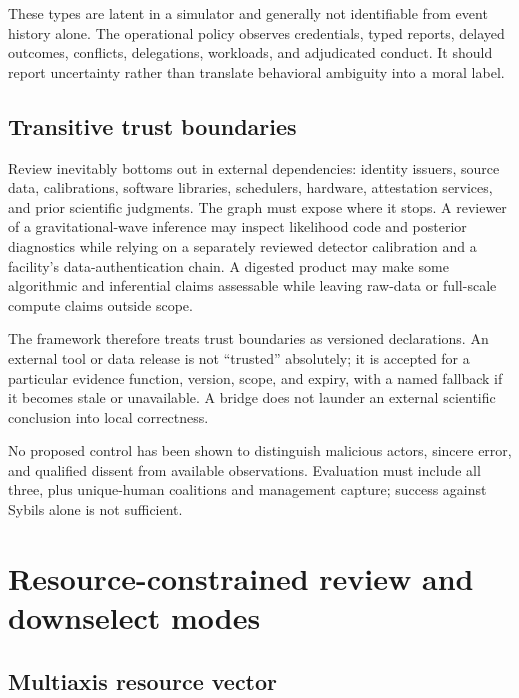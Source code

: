 \documentclass[11pt]{article}
\begin{document}
These types are latent in a simulator and generally not identifiable from event history alone.  The operational policy observes credentials, typed reports, delayed outcomes, conflicts, delegations, workloads, and adjudicated conduct.  It should report uncertainty rather than translate behavioral ambiguity into a moral label.

\subsection{Transitive trust boundaries}

Review inevitably bottoms out in external dependencies: identity issuers, source data, calibrations, software libraries, schedulers, hardware, attestation services, and prior scientific judgments.  The graph must expose where it stops.  A reviewer of a gravitational-wave inference may inspect likelihood code and posterior diagnostics while relying on a separately reviewed detector calibration and a facility's data-authentication chain.  A digested product may make some algorithmic and inferential claims assessable while leaving raw-data or full-scale compute claims outside scope.

The framework therefore treats trust boundaries as versioned declarations.  An external tool or data release is not ``trusted'' absolutely; it is accepted for a particular evidence function, version, scope, and expiry, with a named fallback if it becomes stale or unavailable.  A bridge does not launder an external scientific conclusion into local correctness.

\begin{evidencegate}
No proposed control has been shown to distinguish malicious actors, sincere error, and qualified dissent from available observations.  Evaluation must include all three, plus unique-human coalitions and management capture; success against Sybils alone is not sufficient.
\end{evidencegate}

\section{Resource-constrained review and downselect modes}

\subsection{Multiaxis resource vector}
\end{document}
